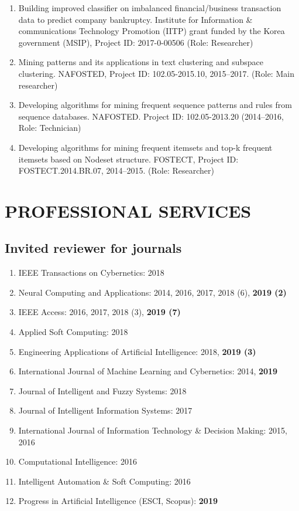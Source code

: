 \documentclass[letterpaper]{article}
\begin{document}
\begin{enumerate}

\item Building improved classifier on imbalanced financial/business transaction data to predict company bankruptcy. Institute for Information \& communications Technology Promotion (IITP) grant funded by the Korea government (MSIP), Project ID: 2017-0-00506 (Role: Researcher) 

\item Mining patterns and its applications in text clustering and subspace clustering. NAFOSTED, Project ID: 102.05-2015.10, 2015--2017. (Role: Main researcher) 

\item Developing algorithms for mining frequent sequence patterns and rules from sequence databases. NAFOSTED. Project ID: 102.05-2013.20 (2014--2016, Role: Technician)

\item Developing algorithms for mining frequent itemsets and top-k frequent itemsets based on Nodeset structure. FOSTECT, Project ID: FOSTECT.2014.BR.07, 2014--2015. (Role: Researcher) 

\end{enumerate}

\section*{PROFESSIONAL SERVICES}

\subsection*{Invited reviewer for journals}

\begin{enumerate}

\item IEEE Transactions on Cybernetics: 2018
\item Neural Computing and Applications: 2014, 2016, 2017, 2018 (6), \textbf{2019 (2)}
\item IEEE Access: 2016, 2017, 2018 (3), \textbf{2019 (7)}
\item Applied Soft Computing: 2018
\item Engineering Applications of Artificial Intelligence: 2018, \textbf{2019 (3)}
\item International Journal of Machine Learning and Cybernetics: 2014, \textbf{2019}
\item Journal of Intelligent and Fuzzy Systems: 2018
\item Journal of Intelligent Information Systems: 2017
\item International Journal of Information Technology \& Decision Making: 2015, 2016
\item Computational Intelligence: 2016
\item Intelligent Automation \& Soft Computing: 2016
\item Progress in Artificial Intelligence (ESCI, Scopus): \textbf{2019}

\end{enumerate}
\end{document}
